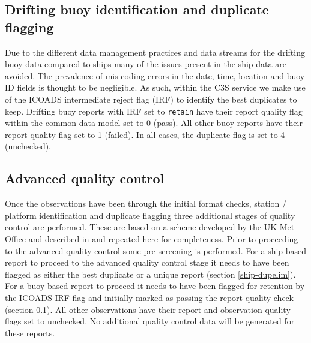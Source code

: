 \subsection{Drifting buoy identification and duplicate flagging}\label{buoy-dupelim}
Due to the different data management practices and data streams for the drifting buoy data compared to ships many of the issues present in the ship data are avoided. 
The prevalence of mis-coding errors in the date, time, location and buoy ID fields is thought to be negligible.
As such, within the C3S service we make use of the ICOADS intermediate reject flag (IRF) to identify the best duplicates to keep.
Drifting buoy reports with IRF set to \texttt{retain} have their report quality flag within the common data model set to 0 (pass).
All other buoy reports have their report quality flag set to 1 (failed). 
In all cases, the duplicate flag is set to 4 (unchecked).

\subsection{Advanced quality control}
Once the observations have been through the initial format checks, station / platform identification and duplicate flagging three additional stages of quality control are performed. 
These are based on a scheme developed by the UK Met Office and described in \cite{Kennedy2017} and repeated here for completeness.
Prior to proceeding to the advanced quality control some pre-screening is performed.
For a ship based report to proceed to the advanced quality control stage it needs to have been flagged as either the best duplicate or a unique report (section \ref{ship-dupelim}).
For a buoy based report to proceed it needs to have been flagged for retention by the ICOADS IRF flag and initially marked as passing the report quality check (section \ref{buoy-dupelim}).
All other observations have their report and observation quality flags set to unchecked. No additional quality control data will be generated for these reports.

